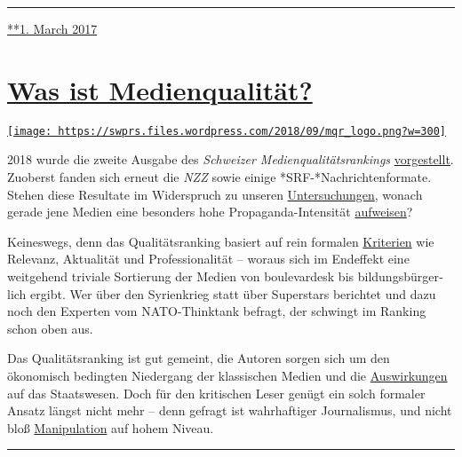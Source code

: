 \begin{center}\rule{0.5\linewidth}{\linethickness}\end{center}

\href{https://swprs.org/2017/03/01/die-woz-und-die-weltpolitik/}{**1.
March 2017}

\hypertarget{was-ist-medienqualituxe4t}{%
\section{\texorpdfstring{\href{https://swprs.org/2017/03/01/medienqualitaet/}{Was
ist
Medienqualität?}}{Was ist Medienqualität?}}\label{was-ist-medienqualituxe4t}}

\href{https://swprs.org/2017/03/01/medienqualitaet/}{\texttt{[image: https://swprs.files.wordpress.com/2018/09/mqr\_logo.png?w=300]}}

2018 wurde die zweite Ausgabe des \emph{Schweizer
Medien­qualitäts­rankings}
\href{http://medienqualitaet-schweiz.ch/files/3115/3578/3114/MQR-18_Hauptbefunde.pdf}{vorgestellt}.
Zuoberst fanden sich erneut die \emph{NZZ} sowie einige
*SRF-*Nach­rich­ten­for­mate. Stehen diese Resultate im Widerspruch zu
unseren \href{https://swprs.org/die-nzz-studie/}{Untersuchungen}, wonach
gerade jene Medien eine besonders hohe Propaganda-Intensität
\href{https://swprs.org/srf-propaganda-analyse/}{aufweisen}?

Keineswegs, denn das Qualitätsranking basiert auf rein formalen
\href{http://www.medienqualitaet-schweiz.ch/index.php/qualitaetsrating/}{Kriterien}
wie Relevanz, Aktualität und Professionalität -- woraus sich im
Endeffekt eine weitgehend triviale Sortierung der Medien von
boulevardesk bis bildungs­bürger­lich ergibt. Wer über den Syrienkrieg
statt über Superstars berichtet und dazu noch den Experten vom
NATO-Thinktank befragt, der schwingt im Ranking schon oben aus.

Das Qualitätsranking ist gut gemeint, die Autoren sorgen sich um den
ökonomisch bedingten Niedergang der klassischen Medien und die
\href{https://www.nzz.ch/feuilleton/medien/was-die-medien-fuer-die-schweizer-demokratie-leisten-ld.1416854}{Auswirkungen}
auf das Staatswesen. Doch für den kritischen Leser genügt ein solch
formaler Ansatz längst nicht mehr -- denn gefragt ist wahrhaftiger
Journalismus, und nicht bloß
\href{https://swprs.org/der-propaganda-schluessel/}{Manipulation} auf
hohem Niveau.

\begin{center}\rule{0.5\linewidth}{\linethickness}\end{center}

